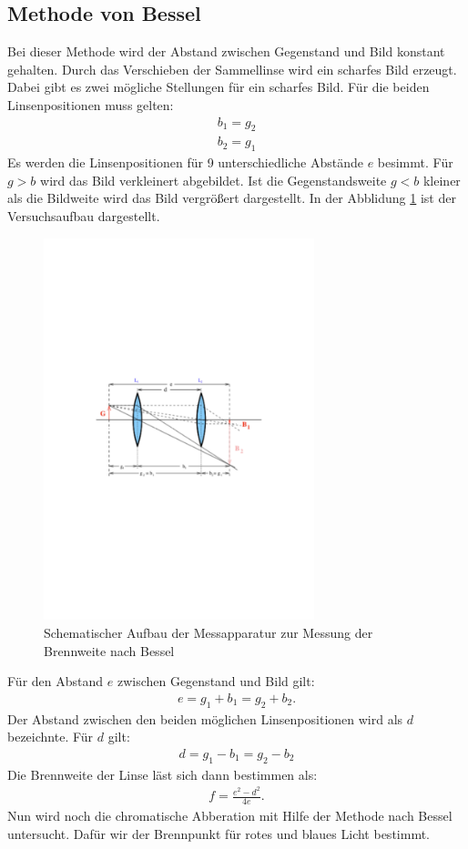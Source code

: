 \subsection{Methode von Bessel}
Bei dieser Methode wird der Abstand zwischen Gegenstand und Bild konstant gehalten.
Durch das Verschieben der Sammellinse wird ein scharfes Bild erzeugt. Dabei gibt es zwei mögliche Stellungen für ein scharfes Bild.
Für die beiden Linsenpositionen muss gelten:
\begin{align*}
  b_1=g_2\\
  b_2=g_1
\end{align*}
Es werden die Linsenpositionen für 9 unterschiedliche Abstände $e$ besimmt.
Für $g>b$ wird das Bild verkleinert abgebildet.
Ist die Gegenstandsweite $g<b$ kleiner als die Bildweite wird das Bild vergrößert dargestellt.
In der Abblidung \ref{fig:bessel} ist der Versuchsaufbau dargestellt.
\begin{figure}[h!]
  \centering
  \includegraphics[width=0.7\textwidth]{theoriebessel.pdf}
  \caption{Schematischer Aufbau der Messapparatur zur Messung der Brennweite nach Bessel \cite{1}}
  \label{fig:bessel}
\end{figure}
Für den Abstand $e$ zwischen Gegenstand und Bild gilt:
\begin{align*}
  e=g_1+b_1=g_2+b_2.
\end{align*}
Der Abstand zwischen den beiden möglichen Linsenpositionen wird als $d$ bezeichnte. Für $d$ gilt:
\begin{align*}
  d=g_1-b_1=g_2-b_2
\end{align*}
Die Brennweite der Linse läst sich dann bestimmen als:
\begin{align}
  f=\frac{e^2-d^2}{4e}.
  \label{eqn:bessel}
\end{align}
Nun wird noch die chromatische Abberation mit Hilfe der Methode nach Bessel untersucht.
Dafür wir der Brennpunkt für rotes und blaues Licht bestimmt.

